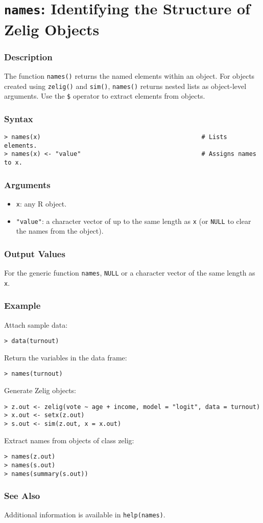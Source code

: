 \section{{\tt names}: Identifying the Structure of Zelig Objects}

\subsubsection{Description}
  The function \texttt{names()} returns the named elements within an
  object.  For objects created using \texttt{zelig()} and
  \texttt{sim()}, \texttt{names()} returns nested lists as
  object-level arguments.  Use the \texttt{\$} operator to extract 
elements
  from objects.  

\subsubsection{Syntax}
\begin{verbatim}
> names(x)                                            # Lists elements. 
> names(x) <- "value"                                 # Assigns names to x.  
\end{verbatim}

\subsubsection{Arguments}
\begin{itemize}
\item {\tt x}: any R object. 
\item {\tt "value"}: a character vector of up to the same length as
  \texttt{x} (or \texttt{NULL} to clear the names from the object).
\end{itemize}

\subsubsection{Output Values}
For the generic function \texttt{names}, \texttt{NULL} or a character
vector of the same length as \texttt{x}.

\subsubsection{Example}
Attach sample data:  
\begin{verbatim}
> data(turnout)
\end{verbatim}
Return the variables in the data frame:  
\begin{verbatim}
> names(turnout)
\end{verbatim}
Generate Zelig objects:
\begin{verbatim}
> z.out <- zelig(vote ~ age + income, model = "logit", data = turnout)
> x.out <- setx(z.out)
> s.out <- sim(z.out, x = x.out)
\end{verbatim}
Extract names from objects of class zelig:
\begin{verbatim}
> names(z.out)
> names(s.out)
> names(summary(s.out))
\end{verbatim}

\subsubsection{See Also}

Additional information is available in {\tt help(names)}.

